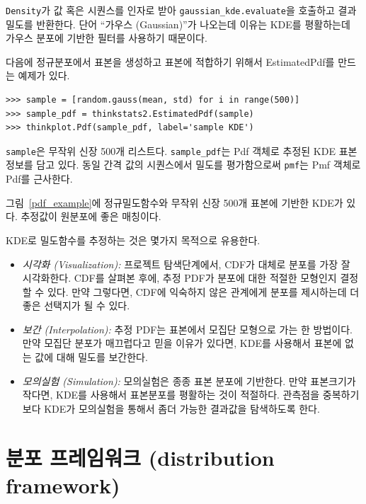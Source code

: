 {\tt Density}가 값 혹은 시퀀스를 인자로 받아 
\verb"gaussian_kde.evaluate"을 호출하고 결과 밀도를 반환한다.
단어 ``가우스 (Gaussian)''가 나오는데 이유는 KDE를 평활하는데 가우스 분포에 기반한 필터를 사용하기 때문이다.

다음에 정규분포에서 표본을 생성하고 표본에 적합하기 위해서 EstimatedPdf를 만드는 예제가 있다.

\begin{verbatim}
>>> sample = [random.gauss(mean, std) for i in range(500)]
>>> sample_pdf = thinkstats2.EstimatedPdf(sample)
>>> thinkplot.Pdf(sample_pdf, label='sample KDE')
\end{verbatim}

\verb"sample"은 무작위 신장 500개 리스트다. 
\verb"sample_pdf"는 Pdf 객체로 추정된 KDE 표본정보를 담고 있다.
동일 간격 값의 시퀀스에서 밀도를 평가함으로써 {\tt pmf}는 Pmf 객체로 Pdf를 근사한다.

그림~\ref{pdf_example}에 정규밀도함수와 무작위 신장 500개 표본에 기반한 KDE가 있다. 추정값이 원분포에 좋은 매칭이다.

KDE로 밀도함수를 추정하는 것은 몇가지 목적으로 유용한다. 


\begin{itemize}

\item {\it 시각화 (Visualization):} 
  프로젝트 탐색단계에서, CDF가 대체로 분포를 가장 잘 시각화한다.
  CDF를 살펴본 후에, 추정 PDF가 분포에 대한 적절한 모형인지 결정할 수 있다.
  만약 그렇다면, CDF에 익숙하지 않은 관계에게 분포를 제시하는데 더 좋은 선택지가 될 수 있다.

\item {\it 보간 (Interpolation):} 
  추정 PDF는 표본에서 모집단 모형으로 가는 한 방법이다.
  만약 모집단 분포가 매끄럽다고 믿을 이유가 있다면, KDE를 사용해서 표본에 없는 값에 대해 밀도를 보간한다.

\item {\it 모의실험 (Simulation):} 
  모의실험은 종종 표본 분포에 기반한다. 
  만약 표본크기가 작다면, KDE를 사용해서 표본분포를 평활하는 것이 적절하다.
  관측점을 중복하기 보다 KDE가 모의실험을 통해서 좀더 가능한 결과값을 탐색하도록 한다.

\end{itemize}


\section{분포 프레임워크 (distribution framework)}


